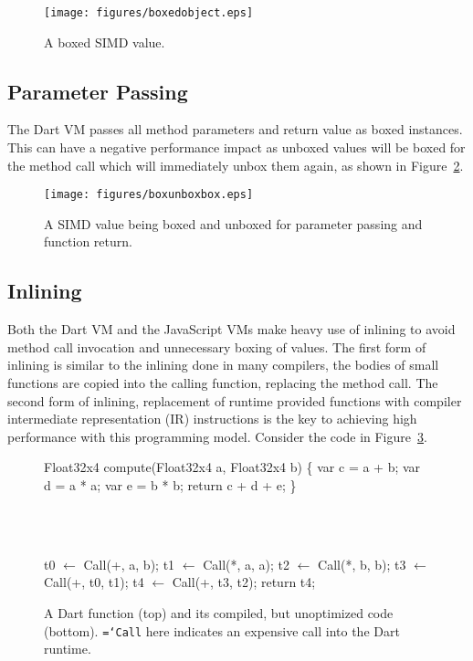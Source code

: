 \documentclass{sigplanconf}
\newcommand{\ttt}[1]{{\texttt{\hyphenchar\font=`\-\relax #1}}}%
\begin{document}
\begin{figure}
\begin{center}
\texttt{[image: figures/boxedobject.eps]}
\end{center}
\caption{A boxed SIMD value.}
\label{fig:boxedobject}
\end{figure}

\subsection{Parameter Passing}

The Dart VM passes all method parameters and return value as boxed
instances. This can have a negative performance impact as unboxed values will be
boxed for the method call which will immediately unbox them again, as shown in
Figure~\ref{fig:boxunboxbox}.

\begin{figure}
\begin{center}
\texttt{[image: figures/boxunboxbox.eps]}
\end{center}
\caption{A SIMD value being boxed and unboxed for parameter passing and
function return.}
\label{fig:boxunboxbox}
\end{figure}

\subsection{Inlining}
\label{inlining}

Both the Dart VM and the JavaScript VMs make heavy use of inlining to avoid
method call invocation and unnecessary boxing of values. The first form of
inlining is similar to the inlining done in many compilers, the bodies of small
functions are copied into the calling function, replacing the method call. The
second form of inlining, replacement of runtime provided functions with compiler
intermediate representation (IR) instructions is the key to achieving high
performance with this programming model. Consider the code in
Figure~\ref{fig:unoptimized}.

\begin{figure}
\begin{small}
\begin{program}[style=tt, number=true]
Fl\tab{}oat32x4 compute(Float32x4 a, Float32x4 b) \{
  var c = a + b;
  var d = a * a;
  var e = b *  b;
  return c + d + e;\untab{}
\}
\end{program}
\end{small}
\ \ \\ \ \ \\
\begin{small}
\begin{program}[style=tt, number=true]
t0 $\leftarrow$ Call(+, a, b);
t1 $\leftarrow$ Call(*, a, a);
t2 $\leftarrow$ Call(*, b, b);
t3 $\leftarrow$ Call(+, t0, t1);
t4 $\leftarrow$ Call(+, t3, t2);
return t4;
\end{program}
\end{small}
\caption{A Dart function (top) and its compiled, but unoptimized code
(bottom). \ttt{Call} here indicates an expensive call into the Dart runtime.}
\label{fig:unoptimized}
\end{figure}
\end{document}
